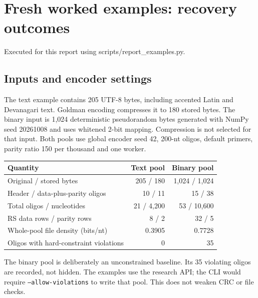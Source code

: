 \documentclass[11pt,a4paper]{article}
\newcommand{\pageheading}[2]{\clearpage\section{#1}{\color{muted}\small #2}\par\vspace{5pt}}
\begin{document}
\pageheading{Fresh worked examples: recovery outcomes}{Executed for this report using scripts/report\_examples.py.}
\subsection*{Inputs and encoder settings}
The text example contains 205 UTF-8 bytes, including accented Latin and Devanagari text.
Goldman encoding compresses it to 180 stored bytes. The binary input is 1,024 deterministic
pseudorandom bytes generated with NumPy seed 20261008 and uses whitened 2-bit mapping.
Compression is not selected for that input. Both pools use global encoder seed 42,
200-nt oligos, default primers, parity ratio 150 per thousand and one worker.

{\small\begin{tabularx}{\linewidth}{Yrr}
\toprule Quantity & Text pool & Binary pool\\\midrule
Original / stored bytes & 205 / 180 & 1,024 / 1,024\\
Header / data-plus-parity oligos & 10 / 11 & 15 / 38\\
Total oligos / nucleotides & 21 / 4,200 & 53 / 10,600\\
RS data rows / parity rows & 8 / 2 & 32 / 5\\
Whole-pool file density (bits/nt) & 0.3905 & 0.7728\\
Oligos with hard-constraint violations & 0 & 35\\\bottomrule
\end{tabularx}}

The binary pool is deliberately an unconstrained baseline. Its 35 violating oligos
are recorded, not hidden. The examples use the research API; the CLI would require
\texttt{--allow-violations} to write that pool. This does not weaken CRC or file checks.
\end{document}
